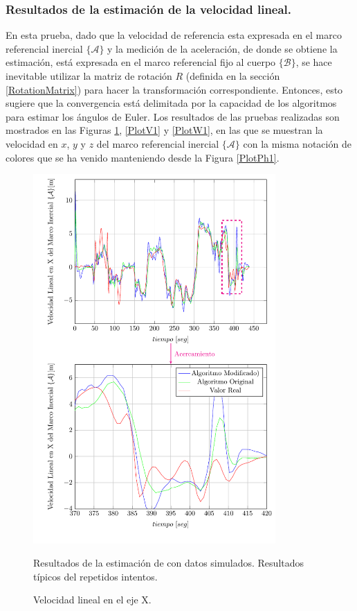\documentclass[conference]{IEEEtran}
\newcommand{\marco}[1]{\{\mathcal{#1}\}}
\begin{document}
\subsubsection{Resultados de la estimación de la velocidad lineal.}
En esta prueba, dado que la velocidad de referencia esta expresada en el marco referencial inercial $\marco{A}$ y la medición de la aceleración, de donde se obtiene la estimación, está expresada en el marco referencial fijo al cuerpo $\marco{B}$, se hace inevitable utilizar la matriz de rotación $R$ (definida en la sección \ref{RotationMatrix}) para hacer la transformación correspondiente. Entonces, esto sugiere que la convergencia está delimitada por la capacidad de los algoritmos para estimar los ángulos de Euler. Los resultados de las pruebas realizadas son mostrados en las Figuras \ref{PlotU1}, \ref{PlotV1} y \ref{PlotW1}, en las que se muestran la velocidad en $x$, $y$ y $z$ del marco referencial inercial $\marco{A}$ con la misma notación de colores que se ha venido manteniendo desde la Figura \ref{PlotPh1}.\par
\begin{figure}
\begin{center}
\includegraphics[width=25em]
{PlotU.pdf}
\caption{Velocidad lineal en el eje X.}
\scriptsize{Resultados de la estimación de con datos simulados. Resultados típicos del repetidos intentos.}
\label{PlotU1}
\end{center}
\end{figure}
\end{document}
